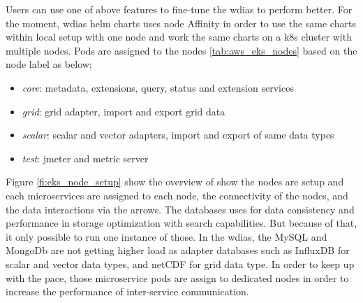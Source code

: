 Users can use one of above features to fine-tune the \acrshort{wdias} to perform better. For the moment, \acrshort{wdias} helm charts uses node Affinity in order to use the same charts within local setup with one node and work the same charts on a \acrshort{k8s} cluster with multiple nodes. Pods are assigned to the nodes \ref{tab:aws_eks_nodes} based on the node label as below;
\begin{itemize}
    \item \emph{core}: metadata, extensions, query, status and extension services
    \item \emph{grid}: grid adapter, import and export grid data
    \item \emph{scalar}: scalar and vector adapters, import and export of same data types
    \item \emph{test}: jmeter and metric server
\end{itemize}
Figure \ref{fi:eks_node_setup} show the overview of show the nodes are setup and each microservices are assigned to each node, the connectivity of the nodes, and the data interactions via the arrows.
The databases uses for data consistency and performance in storage optimization with search capabilities. But because of that, it only possible to run one instance of those. In the \acrshort{wdias}, the MySQL and MongoDb are not getting higher load as adapter databases such as InfluxDB for scalar and vector data types, and netCDF for grid data type. In order to keep up with the pace, those microservice pods are assign to dedicated nodes in order to increase the performance of inter-service communication.

